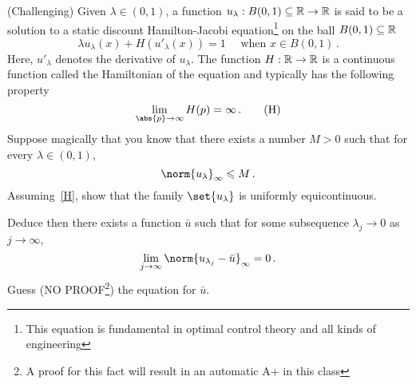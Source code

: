 \documentclass[12pt]{amsart}
\begin{document}
\begin{question}
	(Challenging)
	Given $\lambda \in (0,1)$, a function $u_\lambda: B(0,1) \subseteq \mathbb{R} \to \mathbb{R}$
	is said to be a solution to a  static discount
	Hamilton-Jacobi equation\footnote{This equation is fundamental in optimal control theory and all kinds of engineering}
	on the ball $B(0,1) \subseteq \mathbb{R}$
	\begin{equation*}
		\lambda  u_\lambda(x) + H( u'_\lambda(x)) = 1 \quad \text{ when } x\in B(0,1) \,.
	\end{equation*}
	Here, $u'_\lambda$ denotes the derivative of $u_\lambda$.
	The function $H: \mathbb{R} \to \mathbb{R}$ is a continuous function called the Hamiltonian of the equation and typically has the following property
	\begin{equation}
		\label{H}
		\lim_{\abs{p} \to \infty} H(p) = \infty\,.
		\tag{H}
	\end{equation}
	Suppose magically that you know that there exists a number $M >0$ such that
	for every $\lambda \in (0,1)$,
	\begin{equation*}
		\norm{u_\lambda}_\infty \leq M\,.
	\end{equation*}
	Assuming~\eqref{H},
	show that the family $\set{u_\lambda}$ is uniformly equicontinuous.

	Deduce then there exists a function $\bar u$ such that for some subsequence
	$\lambda_j \to 0$ as $j\to \infty$,
	\begin{equation*}
		\lim_{j\to \infty} \norm{u_{\lambda_j} - \bar u}_\infty = 0\,.
	\end{equation*}
	Guess  (NO PROOF\footnote{A proof for this fact will result in an automatic A+ in this class}) the equation for $\bar u$.
\end{question}
\end{document}
